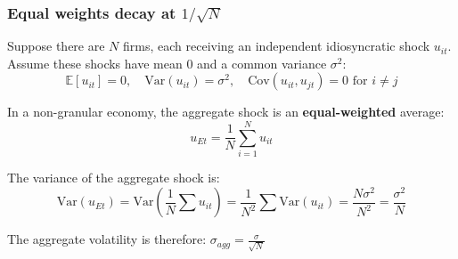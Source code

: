 \documentclass[aspectratio=169,11pt]{beamer}
\begin{document}
\begin{frame}
    \label{app_sqrtn}
    \frametitle{Equal weights decay at $1/\sqrt{N}$}

    \vspace{0.4cm}
    Suppose there are $N$ firms, each receiving an independent idiosyncratic shock $u_{it}$.
    Assume these shocks have mean 0 and a common variance $\sigma^2$:
    \begin{equation*}
        \mathbb{E}[u_{it}] = 0, \quad \text{Var}(u_{it}) = \sigma^2, \quad \text{Cov}(u_{it}, u_{jt}) = 0 \text{ for } i \neq j
    \end{equation*}

    \vspace{0.4cm}
    In a non-granular economy, the aggregate shock is an \textbf{equal-weighted} average:
    \begin{equation*}
        u_{Et} = \frac{1}{N} \sum_{i=1}^N u_{it}
    \end{equation*}

    \vspace{0.4cm}
    The variance of the aggregate shock is:
    \begin{equation*}
        \text{Var}(u_{Et}) = \text{Var}\left( \frac{1}{N} \sum u_{it} \right) = \frac{1}{N^2} \sum \text{Var}(u_{it}) = \frac{N \sigma^2}{N^2} =
        \frac{\sigma^2}{N}
    \end{equation*}

    {
    The aggregate volatility is therefore: { $\sigma_{agg} = \frac{\sigma}{\sqrt{N}}$}
    }
    \hfill \hyperlink{src_sqrtn}{}
\end{frame}
\end{document}
